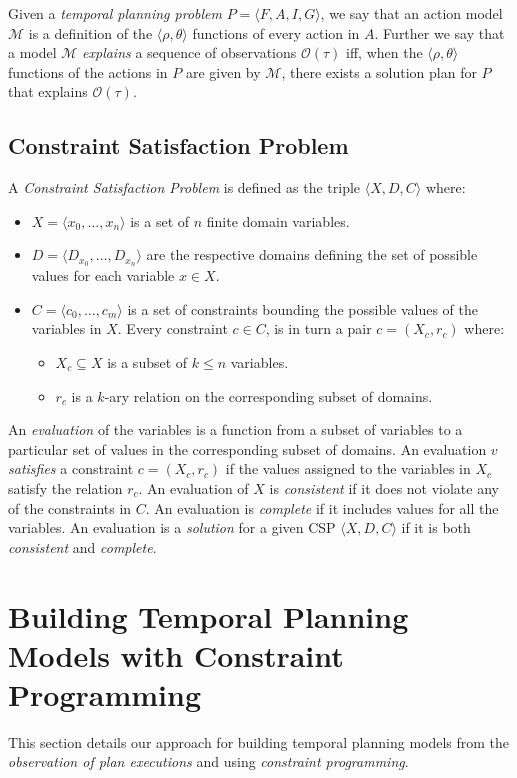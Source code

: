 \documentclass[letterpaper]{article} %
\newcommand{\tup}[1]{{\langle #1 \rangle}}
\begin{document}
Given a {\em temporal planning problem} $P=\tup{F,A,I,G}$, we say that an action model $\mathcal{M}$ is a definition of the $\tup{\rho,\theta}$ functions of every action in $A$. Further we say that a model $\mathcal{M}$ {\em explains} a sequence of observations $\mathcal{O}(\tau)$ iff, when the $\tup{\rho,\theta}$ functions of the actions in $P$ are given by $\mathcal{M}$, there exists a solution plan for $P$ that explains $\mathcal{O}(\tau)$.


\subsection{Constraint Satisfaction Problem}
A {\em Constraint Satisfaction Problem} is defined as the triple $\tup{X,D,C}$ where:
\begin{itemize}
\item $X=\tup{x_0, \ldots, x_n}$ is a set of $n$ finite domain variables.
\item $D=\tup{D_{x_0}, \ldots, D_{x_n}}$ are the respective domains defining the set of possible values for each variable $x\in X$.
\item $C=\tup{c_0, \ldots, c_m}$ is a set of constraints bounding the possible values of the variables in $X$. Every constraint $c\in C$, is in turn a pair $c=(X_c,r_c)$ where:
\begin{itemize}
\item $X_c\subseteq X$ is a subset of $k\leq n$ variables.
\item $r_c$ is a $k$-ary relation on the corresponding subset of domains.
\end{itemize}
\end{itemize}

An {\em evaluation} of the variables is a function from a subset of variables to a particular set of values in the corresponding subset of domains. An evaluation $v$ {\em satisfies} a constraint $c=(X_c,r_c)$ if the values assigned to the variables in $X_c$ satisfy the relation $r_c$. An evaluation of $X$ is {\em consistent} if it does not violate any of the constraints in $C$. An evaluation is {\em complete} if it includes values for all the variables. An evaluation is a {\em solution} for a given CSP $\tup{X,D,C}$ if it is both {\em consistent} and {\em complete}. 

\section{Building Temporal Planning Models with Constraint Programming}
\label{sec:learning}
This section details our approach for building temporal planning models from the {\em observation of plan executions} and using {\em constraint programming}.
\end{document}
